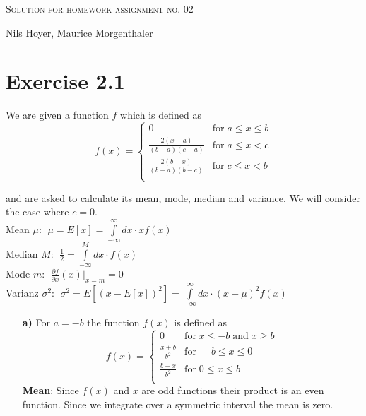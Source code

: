 \documentclass[10pt]{article}
\newenvironment{myfont}{\fontfamily{put}\selectfont}{\par}
\begin{document}
\begin{myfont}



\begin{center}
	\begin{Large}
		\textsc{Solution for homework assignment no. 02} \\
	\end{Large}
	\vspace*{0.4cm}
		Nils Hoyer, Maurice Morgenthaler
		\vspace*{1cm}
\end{center}

\section*{Exercise 2.1}

We are given a function $f$ which is defined as
\begin{equation}
f(x) =
\begin{cases}
0                           & \textrm{for}\; a \leq x \leq b \\
\frac{2(x-a)}{(b-a)(c-a)}   & \textrm{for}\; a \leq x < c \\
\frac{2(b-x)}{(b-a)(b-c)}   & \textrm{for}\; c \leq x < b \\
\end{cases}
\end{equation}

\noindent and are asked to calculate its mean, mode, median and variance.
We will consider the case where $c = 0$. \\

\noindent Mean $\mu$: $\;\mu = E[x] = \int\limits_{-\infty}^{\infty}dx \cdot xf(x)$ \\
\noindent Median $M$: $\;\frac{1}{2} = \int\limits_{-\infty}^{M}dx \cdot f(x)$ \\
\noindent Mode $m$: $\;\frac{\partial f}{\partial x}(x)|_{x = m} = 0$ \\
\noindent Varianz $\sigma^{2}$: $\;\sigma^{2} = E[(x - E[x])^{2}] = \int\limits_{-\infty}^{\infty}dx \cdot (x - \mu)^{2}f(x)$

\begin{itemize}
  \item[\textbf{a)}] For $a = -b$ the function $f(x)$ is defined as
  $$
  f(x) = 
  \begin{cases}
  0                         & \textrm{for}\; x \leq -b \; \textrm{and}\; x \geq b \\
  \frac{x+b}{b^{2}}         & \textrm{for}\; -b \leq x \leq 0 \\
  \frac{b-x}{b^{2}}         & \textrm{for}\; 0 \leq x \leq b \\
  \end{cases}
  $$
  \noindent \textbf{Mean}: Since $f(x)$ and $x$ are odd functions their product is an even function. 
  Since we integrate over a symmetric interval the mean is zero. \\


\end{itemize}
\end{myfont}
\end{document}

